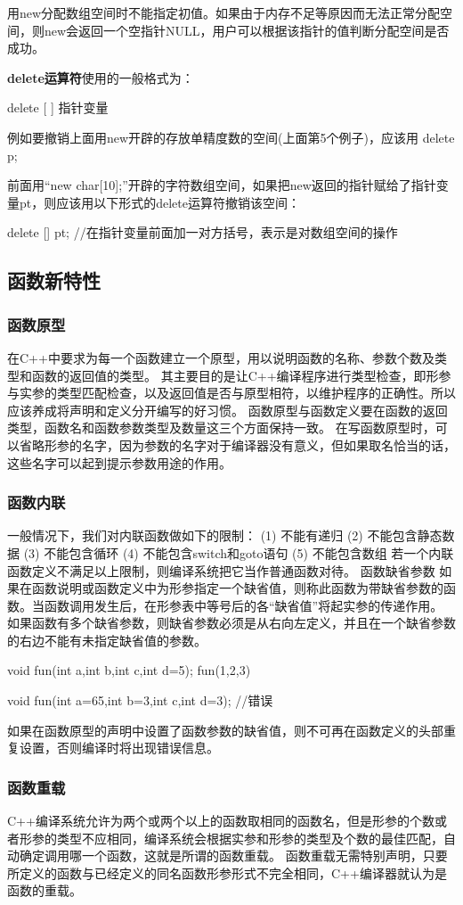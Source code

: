 用new分配数组空间时不能指定初值。如果由于内存不足等原因而无法正常分配空间，则new会返回一个空指针NULL，用户可以根据该指针的值判断分配空间是否成功。

\textbf{delete运算符}使用的一般格式为：

delete [ ] 指针变量

例如要撤销上面用new开辟的存放单精度数的空间(上面第5个例子)，应该用
delete p;

前面用“new char[10];”开辟的字符数组空间，如果把new返回的指针赋给了指针变量pt，则应该用以下形式的delete运算符撤销该空间：
\begin{Code}
delete [] pt;  //在指针变量前面加一对方括号，表示是对数组空间的操作
\end{Code}
\subsection{函数新特性}
\subsubsection{函数原型 }
在C++中要求为每一个函数建立一个原型，用以说明函数的名称、参数个数及类型和函数的返回值的类型。
其主要目的是让C++编译程序进行类型检查，即形参与实参的类型匹配检查，以及返回值是否与原型相符，以维护程序的正确性。所以应该养成将声明和定义分开编写的好习惯。
函数原型与函数定义要在函数的返回类型，函数名和函数参数类型及数量这三个方面保持一致。
在写函数原型时，可以省略形参的名字，因为参数的名字对于编译器没有意义，但如果取名恰当的话，这些名字可以起到提示参数用途的作用。
\subsubsection{函数内联}
一般情况下，我们对内联函数做如下的限制：
(1) 不能有递归
(2) 不能包含静态数据
(3) 不能包含循环
(4) 不能包含switch和goto语句
(5) 不能包含数组
若一个内联函数定义不满足以上限制，则编译系统把它当作普通函数对待。
函数缺省参数
如果在函数说明或函数定义中为形参指定一个缺省值，则称此函数为带缺省参数的函数。当函数调用发生后，在形参表中等号后的各“缺省值”将起实参的传递作用。
如果函数有多个缺省参数，则缺省参数必须是从右向左定义，并且在一个缺省参数的右边不能有未指定缺省值的参数。

void fun(int a,int b,int c,int d=5);          
fun(1,2,3)

void fun(int a=65,int b=3,int c,int d=3);     //错误

如果在函数原型的声明中设置了函数参数的缺省值，则不可再在函数定义的头部重复设置，否则编译时将出现错误信息。
\subsubsection{函数重载}
C++编译系统允许为两个或两个以上的函数取相同的函数名，但是形参的个数或者形参的类型不应相同，编译系统会根据实参和形参的类型及个数的最佳匹配，自动确定调用哪一个函数，这就是所谓的函数重载。
函数重载无需特别声明，只要所定义的函数与已经定义的同名函数形参形式不完全相同，C++编译器就认为是函数的重载。

